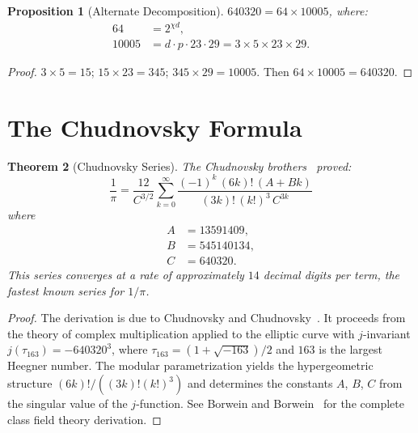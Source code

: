 \documentclass[11pt,a4paper]{article}
\theoremstyle{plain}
\newtheorem{theorem}{Theorem}[section]
\newtheorem{proposition}[theorem]{Proposition}
\theoremstyle{definition}
\begin{document}
\begin{proposition}[Alternate Decomposition]\label{prop:640320-alt}
$640320 = 64 \times 10005$, where:
\begin{align}
  64 &= 2^{\chi d}, \label{eq:64} \\
  10005 &= d \cdot p \cdot 23 \cdot 29 = 3 \times 5 \times 23 \times 29.
  \label{eq:10005}
\end{align}
\end{proposition}

\begin{proof}
$3 \times 5 = 15$; $15 \times 23 = 345$; $345 \times 29 = 10005$.
Then $64 \times 10005 = 640320$. \checkmark
\end{proof}

\section{The Chudnovsky Formula}\label{sec:chudnovsky}

\begin{theorem}[Chudnovsky Series]\label{thm:chudnovsky}
The Chudnovsky brothers~\cite{chudnovsky1989} proved:
\begin{equation}\label{eq:chudnovsky}
  \frac{1}{\pi}
  = \frac{12}{C^{3/2}}
  \sum_{k=0}^{\infty}
  \frac{(-1)^k\, (6k)!\, (A + Bk)}{(3k)!\,(k!)^3\, C^{3k}}
\end{equation}
where
\begin{align}
  A &= 13591409, \label{eq:A} \\
  B &= 545140134, \label{eq:B} \\
  C &= 640320. \label{eq:C}
\end{align}
This series converges at a rate of approximately $14$ decimal digits per
term, the fastest known series for $1/\pi$.
\end{theorem}

\begin{proof}
The derivation is due to Chudnovsky and Chudnovsky~\cite{chudnovsky1989}.
It proceeds from the theory of complex multiplication applied to the
elliptic curve with $j$-invariant $j(\tau_{163}) = -640320^3$, where
$\tau_{163} = (1 + \sqrt{-163})/2$ and $163$ is the largest Heegner
number. The modular parametrization yields the hypergeometric structure
$(6k)!/((3k)!(k!)^3)$ and determines the constants $A$, $B$, $C$ from
the singular value of the $j$-function. See Borwein and
Borwein~\cite{borwein1987} for the complete class field theory
derivation.
\end{proof}
\end{document}
